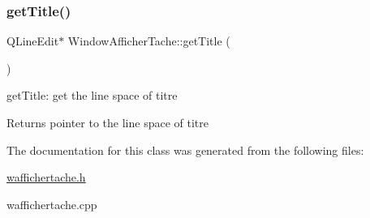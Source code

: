 \subsubsection{\texorpdfstring{get\+Title()}{getTitle()}}
{\footnotesize\ttfamily Q\+Line\+Edit$\ast$ Window\+Afficher\+Tache\+::get\+Title (\begin{DoxyParamCaption}{ }\end{DoxyParamCaption})\hspace{0.3cm}{\ttfamily [inline]}}



get\+Title\+: get the line space of titre 

\begin{DoxyReturn}{Returns}
pointer to the line space of titre 
\end{DoxyReturn}


The documentation for this class was generated from the following files\+:\begin{DoxyCompactItemize}
\item 
\hyperlink{waffichertache_8h}{waffichertache.\+h}\item 
waffichertache.\+cpp\end{DoxyCompactItemize}
